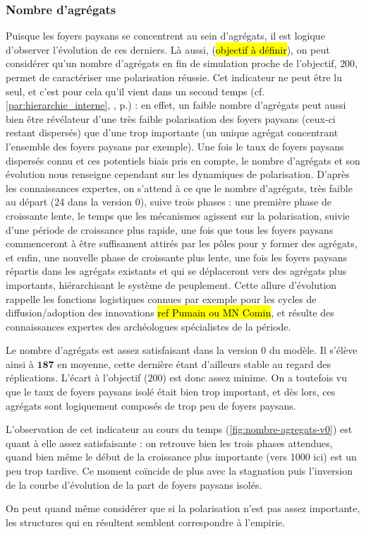 \clearpage

\subsubsection{Nombre d'agrégats}

Puisque les foyers paysans se concentrent au sein d'agrégats, il est logique d'observer l'évolution de ces derniers.
Là aussi, (\hl{objectif à définir}), on peut considérer qu'un nombre d'agrégats en fin de simulation proche de l'objectif, $200$, permet de caractériser une polarisation réussie.
Cet indicateur ne peut être lu seul, et c'est pour cela qu'il vient dans un second temps (cf. \ref{par:hierarchie_interne}, , p.\pageref{par:hierarchie_interne}) :
en effet, un faible nombre d'agrégats peut aussi bien être révélateur d'une très faible polarisation des foyers paysans (ceux-ci restant dispersés) que d'une trop importante (un unique agrégat concentrant l'ensemble des foyers paysans par exemple).
Une fois le taux de foyers paysans dispersés connu et ces potentiels biais pris en compte, le nombre d'agrégats et son évolution nous renseigne cependant sur les dynamiques de polarisation.
D'après les connaissances expertes, on s'attend à ce que le nombre d'agrégats, très faible au départ (24 dans la version 0), suive trois phases :
une première phase de croissante lente, le temps que les mécanismes agissent sur la polarisation, suivie d'une période de croissance plus rapide, une fois que tous les foyers paysans commenceront à être suffisament attirés par les pôles pour y former des agrégats, et enfin, une nouvelle phase de croissante plus lente, une fois les foyers paysans répartis dans les agrégats existants et qui se déplaceront vers des agrégats plus importants, hiérarchisant le système de peuplement.
Cette allure d'évolution rappelle les fonctions logistiques connues par exemple pour les cycles de diffusion/adoption des innovations \hl{ref Pumain ou MN Comin}, et résulte des connaissances expertes des archéologues spécialistes de la période.

\begin{mdframed}[backgroundcolor=gray!10,footnoteinside=false]
Le nombre d'agrégats est assez satisfaisant dans la version 0 du modèle.
Il s'élève ainsi à $\textbf{187}$ en moyenne, cette dernière étant d'ailleurs stable au regard des réplications.
L'écart à l'objectif ($200$) est donc assez minime.
On a toutefois vu que le taux de foyers paysans isolé était bien trop important, et dès lors, ces agrégats sont logiquement composés de trop peu de foyers paysans.

L'observation de cet indicateur au cours du temps (\cref{fig:nombre-agregats-v0}) est quant à elle assez satisfaisante :
on retrouve bien les trois phases attendues, quand bien même le début de la croissance plus importante (vers 1000 ici) est un peu trop tardive.
Ce moment coïncide de plus avec la stagnation puis l'inversion de la courbe d'évolution de la part de foyers paysans isolés.

On peut quand même considérer que si la polarisation n'est pas assez importante, les structures qui en résultent semblent correspondre à l'empirie.
\end{mdframed}


